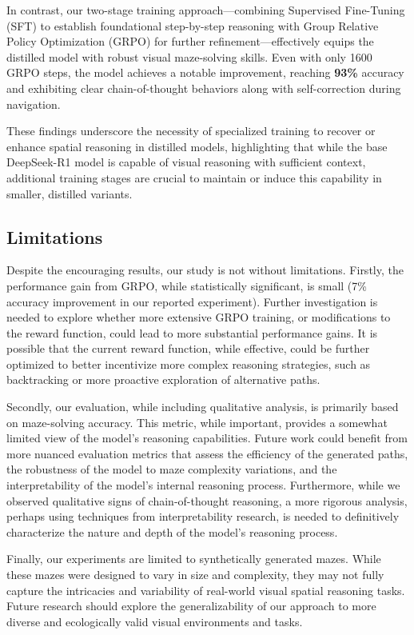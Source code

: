 In contrast, our two-stage training approach—combining Supervised Fine-Tuning (SFT) to establish foundational step-by-step reasoning with Group Relative Policy Optimization (GRPO) for further refinement—effectively equips the distilled model with robust visual maze-solving skills. Even with only 1600 GRPO steps, the model achieves a notable improvement, reaching \textbf{93\%} accuracy and exhibiting clear chain-of-thought behaviors along with self-correction during navigation.

These findings underscore the necessity of specialized training to recover or enhance spatial reasoning in distilled models, highlighting that while the base DeepSeek-R1 model is capable of visual reasoning with sufficient context, additional training stages are crucial to maintain or induce this capability in smaller, distilled variants.

\subsection{Limitations}
\label{subsec:limitations}

Despite the encouraging results, our study is not without limitations.  Firstly, the performance gain from GRPO, while statistically significant, is small (7\% accuracy improvement in our reported experiment).  Further investigation is needed to explore whether more extensive GRPO training, or modifications to the reward function, could lead to more substantial performance gains.  It is possible that the current reward function, while effective, could be further optimized to better incentivize more complex reasoning strategies, such as backtracking or more proactive exploration of alternative paths.

Secondly, our evaluation, while including qualitative analysis, is primarily based on maze-solving accuracy.  This metric, while important, provides a somewhat limited view of the model's reasoning capabilities.  Future work could benefit from more nuanced evaluation metrics that assess the efficiency of the generated paths, the robustness of the model to maze complexity variations, and the interpretability of the model's internal reasoning process.  Furthermore, while we observed qualitative signs of chain-of-thought reasoning, a more rigorous analysis, perhaps using techniques from interpretability research, is needed to definitively characterize the nature and depth of the model's reasoning process.

Finally, our experiments are limited to synthetically generated mazes.  While these mazes were designed to vary in size and complexity, they may not fully capture the intricacies and variability of real-world visual spatial reasoning tasks.  Future research should explore the generalizability of our approach to more diverse and ecologically valid visual environments and tasks.